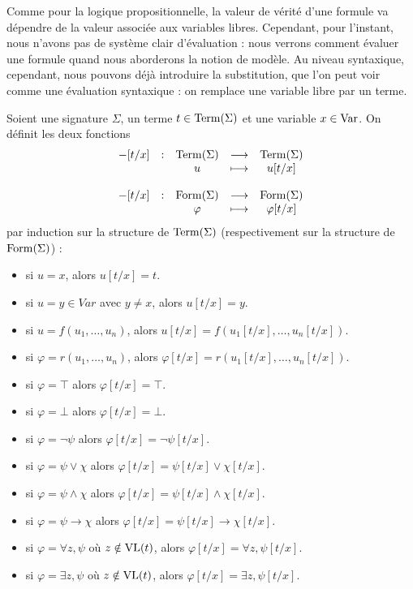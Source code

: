 Comme pour la logique propositionnelle, la valeur de vérité d'une formule va
dépendre de la valeur associée aux variables libres. Cependant, pour l'instant,
nous n'avons pas de système clair d'évaluation : nous verrons comment évaluer
une formule quand nous aborderons la notion de modèle. Au niveau syntaxique,
cependant, nous pouvons déjà introduire la substitution, que l'on peut voir comme
une évaluation syntaxique : on remplace une variable libre par un terme.

\begin{definition}[Substitution]
  Soient une signature $\Sigma$, un terme $t\in \operatorname{Term}(\Sigma)$ et une variable
  $x\in \operatorname{Var}$. On définit les deux fonctions
  \[\begin{array}{rcccc}
  -[t/x] &: & \operatorname{Term}(\Sigma) & \longrightarrow & \operatorname{Term}(\Sigma)\\
  & & u & \longmapsto & u[t/x] \\
  \\
  -[t/x] &: & \operatorname{Form}(\Sigma) & \longrightarrow & \operatorname{Form}(\Sigma)\\
  & & \varphi & \longmapsto & \varphi[t/x]
  \end{array}\]
  par induction sur la structure de $\operatorname{Term}(\Sigma)$ (respectivement sur la
  structure de $\operatorname{Form}(\Sigma)$) :
  \begin{itemize}
  \item si $u = x$, alors $u[t/x] = t$.
  \item si $u = y\in Var$ avec $y \neq x$, alors $u[t/x] = y$.
  \item si $u = f(u_1,\ldots,u_n)$, alors $u[t/x] = f(u_1[t/x],\ldots,u_n[t/x])$.
  \item si $\varphi = r(u_1,\ldots,u_n)$, alors
    $\varphi[t/x] = r(u_1[t/x],\ldots,u_n[t/x])$.
  \item si $\varphi = \top$ alors $\varphi[t/x] = \top$.
  \item si $\varphi = \bot$ alors $\varphi[t/x] = \bot$.
  \item si $\varphi = \lnot \psi$ alors $\varphi[t/x] = \lnot \psi[t/x]$.
  \item si $\varphi = \psi \lor \chi$ alors
    $\varphi[t/x] = \psi[t/x]\lor\chi[t/x]$.
  \item si $\varphi = \psi \land \chi$ alors
    $\varphi[t/x] = \psi[t/x]\land\chi[t/x]$.
  \item si $\varphi = \psi \to \chi$ alors
    $\varphi[t/x] = \psi[t/x]\to\chi[t/x]$.
  \item si $\varphi = \forall z, \psi$ où $z\notin \operatorname{VL}(t)$, alors
    $\varphi[t/x] = \forall z, \psi[t/x]$.
  \item si $\varphi = \exists z, \psi$ où $z\notin \operatorname{VL}(t)$, alors
    $\varphi[t/x] = \exists z, \psi[t/x]$.
  \end{itemize}
\end{definition}


